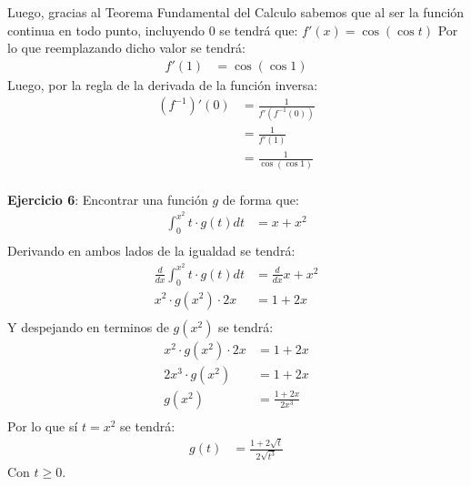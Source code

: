 \documentclass[../../main.tex]{subfiles}
\begin{document}
\begin{partes}
        Luego, gracias al Teorema Fundamental del Calculo sabemos que al ser la función continua en todo punto, incluyendo $0$ se tendrá que:
        $f'(x) = \cos(\cos t)$
        Por lo que reemplazando dicho valor se tendrá:
        \begin{align*}
            f'(1) &= \cos(\cos 1)
        \end{align*}
        Luego, por la regla de la derivada de la función inversa:
        \begin{align*}
            (f^{-1})'(0) &= \frac{1}{f'(f^{-1}(0))}\\
            &= \frac{1}{f'(1)}\\
            &= \frac{1}{\cos(\cos 1)}\\
        \end{align*}
    \end{partes}

    \question \textbf{Ejercicio 6}: Encontrar una función $g$ de forma que:
    \begin{align*}
        \int_{0}^{x^2} t \cdot g(t) dt &= x + x^2\\
    \end{align*}
    Derivando en ambos lados de la igualdad se tendrá:
    \begin{align*}
        \frac{d}{dx} \int_{0}^{x^2} t \cdot g(t) dt &= \frac{d}{dx} x+x^2\\
        x^2 \cdot g(x^2) \cdot 2x &= 1 + 2x\\
    \end{align*}
    Y despejando en terminos de $g(x^2)$ se tendrá:
    \begin{align*}
        x^2 \cdot g(x^2) \cdot 2x &= 1 + 2x\\
        2x^3 \cdot g(x^2) &= 1 + 2x\\
        g(x^2) &= \frac{1+2x}{2x^3}\\
    \end{align*}
    Por lo que sí $t = x^2$ se tendrá:
    \begin{align*}
        g(t) &= \frac{1+2\sqrt{t}}{2\sqrt{t^3}}
    \end{align*}
    Con $t \ge 0$.
\end{document}
